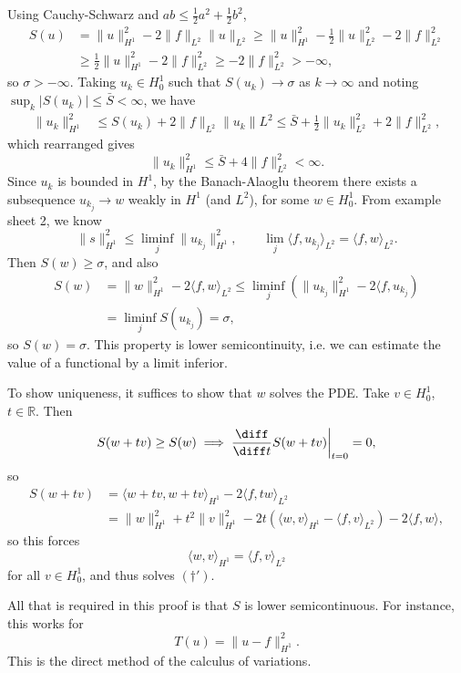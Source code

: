 \documentclass[12pt]{article}
\begin{document}
\begin{proofbox}
	Using Cauchy-Schwarz and $ab \leq \frac{1}{2} a^2 + \frac{1}{2} b^2$,
	\begin{align*}
		S(u) &= \|u\|^2_{H^1} - 2 \|f\|_{L^2} \|u\|_{L^2} \geq \|u\|^2_{H^1} - \frac{1}{2} \|u\|^2_{L^2} - 2 \|f\|^2_{L^2} \\
		     &\geq \frac{1}{2} \|u\|^2_{H^1} - 2 \|f\|^2_{L^2} \geq - 2 \|f\|^2_{L^2} > -\infty,
	\end{align*}
	so $\sigma > -\infty$. Taking $u_k \in H^1_0$ such that $S(u_k) \to \sigma$ as $k \to \infty$ and noting $\sup_k |S(u_k)| \leq \bar S < \infty$, we have
	\begin{align*}
		\|u_k\|^2_{H^1} &\leq S(u_k) + 2 \|f\|_{L^2}\|u_k\|L^2 \leq \bar S + \frac{1}{2} \|u_k\|^2_{L^2} + 2 \|f\|^2_{L^2},
	\end{align*}
	which rearranged gives
	\[
	\|u_k\|^2_{H^1} \leq \bar S + 4 \|f\|^2_{L^2} < \infty.
	\]
	Since $u_k$ is bounded in $H^1$, by the Banach-Alaoglu theorem there exists a subsequence $u_{k_j} \to w$ weakly in $H^1$ (and $L^2$), for some $w \in H^1_0$. From example sheet 2, we know
	\[
	\|s\|^2_{H^1} \leq \liminf_{j} \|u_{k_j}\|^2_{H^1}, \qquad \lim_j \langle f, u_{k_j} \rangle_{L^2} = \langle f, w \rangle_{L^2}.
	\]
	Then $S(w) \geq \sigma$, and also
	\begin{align*}
		S(w) &= \|w\|^2_{H^1} - 2 \langle f, w \rangle_{L^2} \leq \liminf_j ( \|u_{k_j}\|^2_{H^1} - 2 \langle f, u_{k_j}) \\
		     &= \liminf_{j}  S(u_{k_j}) = \sigma,
	\end{align*}
	so $S(w) = \sigma$. This property is lower semicontinuity, i.e. we can estimate the value of a functional by a limit inferior.

	To show uniqueness, it suffices to show that $w$ solves the PDE. Take $v \in H^1_0$, $t \in \mathbb{R}$. Then
	\[
	S(w + tv) \geq S(w) \implies \frac{\diff}{\diff t}S(w + tv) \biggr|_{t = 0} = 0,
	\]
	so
	\begin{align*}
		S(w + tv) &= \langle w + tv, w + tv\rangle_{H^1} - 2 \langle f, tw \rangle_{L^2} \\
			  &= \|w\|^2_{H^1} + t^2 \|v\|^2_{H^1} - 2 t \left( \langle w, v \rangle _{H^1} - \langle f, v \rangle_{L^2} \right) - 2 \langle f, w \rangle,
	\end{align*}
	so this forces
	\[
	\langle w, v \rangle_{H^1} = \langle f, v\rangle_{L^2}
	\]
	for all $v \in H^1_0$, and thus solves $(\dagger')$.
\end{proofbox}

\begin{remark}
	All that is required in this proof is that $S$ is lower semicontinuous. For instance, this works for
	\[
	T(u) = \|u - f\|^2_{H^1}.
	\]
	This is the direct method of the calculus of variations.
\end{remark}


\newpage

\printindex
\end{document}
